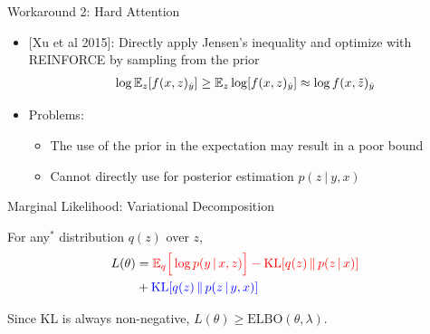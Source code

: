 \begin{frame}{Workaround 2: Hard Attention}
\begin{itemize}
\item {\small[Xu et al 2015]}: Directly apply Jensen's inequality and optimize
    with REINFORCE by sampling from the prior
    \begin{eqnarray*}
        \log \mathbb{E}_z [f(x, z)_{\hat{y}}] \ge \mathbb{E}_z \log [f(x, z)_{\hat{y}}] \approx \log f(x, \tilde{z})_{\hat{y}}
    \end{eqnarray*}


  \item Problems:
    \begin{itemize}
    \item The use of the prior in the expectation may result in a poor
      bound
    \item Cannot directly use for posterior estimation $p(z\ |\ y, x)$
    \end{itemize}
  \end{itemize}
\end{frame}


\begin{frame}
{Marginal Likelihood: Variational Decomposition}

For any$^*$
distribution $q(z)$ over $z$,
\begin{align*}
 L(\theta) &= \textcolor{red}{\mathbb{E}_{q}\Big[\log p(y \,|\, x, z) \Big] - \operatorname*{KL}[q(z) \, \Vert \, p(z
  \,|\, x)] } \\ &
+ \textcolor{blue}{\operatorname*{KL}[q(z )  \, \Vert \, p(z \,|\, y, x )]}
\end{align*}

\begin{center}
\end{center}


Since KL is always non-negative, $L(\theta) \geq \text{ELBO}(\theta, \lambda)$.
\end{frame}


